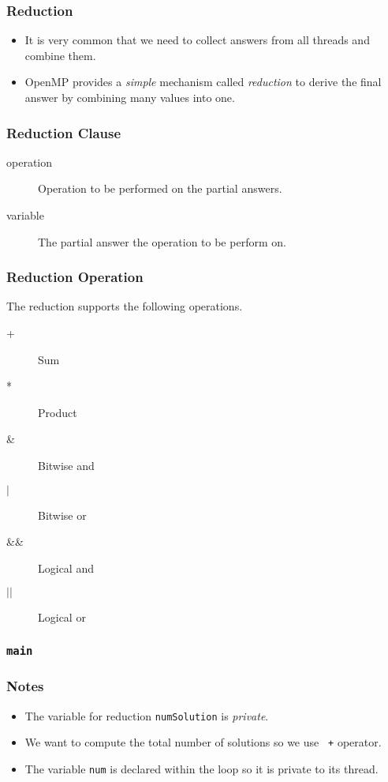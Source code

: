 \documentclass{beamer}
\begin{document}
\begin{frame}
\frametitle{Reduction}
\begin{itemize}
\item It is very common that we need to collect answers from all
  threads and combine them.
\item OpenMP provides a {\em simple} mechanism called {\em reduction} to
  derive the final answer by combining many values into one.
\end{itemize}
\end{frame}


\begin{frame}
  \frametitle{Reduction Clause} 
  \begin{description}
  \item[operation] Operation to be performed on the partial answers.
  \item[variable] The partial answer the operation to be perform
    on.
  \end{description}
\end{frame}

\begin{frame}
  \frametitle{Reduction Operation} 
  The reduction supports the following operations.
  \begin{description}
  \item [+] Sum
  \item [*] Product
  \item [\&] Bitwise and
  \item [$|$] Bitwise or
  \item [\&\&] Logical and
  \item [$||$] Logical or
  \end{description}
\end{frame}


\begin{frame}
\frametitle{\tt main}
\end{frame}

\begin{frame}
\frametitle{Notes}
\begin{itemize}
\item The variable for reduction {\tt numSolution} is {\em private}.
\item We want to compute the total number of solutions so we use {\tt
  +} operator.
\item The variable {\tt num} is declared within the loop so it is
  private to its thread.
\end{itemize}
\end{frame}
\end{document}
